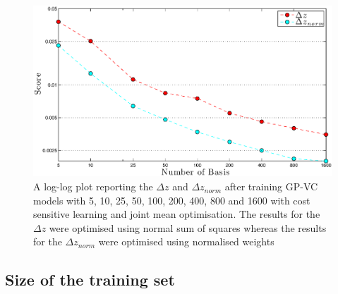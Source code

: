\documentclass[useAMS,usenatbib,fleqn]{mn2e}
\begin{document}
\begin{figure}
       \centering
       \includegraphics[width=\columnwidth]{figures/1600.eps}
        \caption{A log-log plot reporting the $\Delta z$ and $\Delta z_{norm}$ after training GP-VC models with 5, 10, 25, 50, 100, 200, 400, 800 and 1600 with cost sensitive learning and joint mean optimisation. The results for the $\Delta z$ were optimised using normal sum of squares whereas the results for the $\Delta z_{norm}$ were optimised using normalised weights}
       \label{fig-1600}
\end{figure}

\subsection{Size of the training set}
\label{sec-sizetraining}
\end{document}
